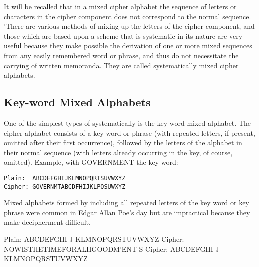 It will be recalled that in a mixed cipher alphabet the sequence of
letters or characters in the cipher component does not correspond to the
normal sequence. 'There are various methods of mixing up the letters of
the cipher component, and those which are based upon a scheme that is
systematic in its nature are very useful because they make possible the
derivation of one or more mixed sequences from any easily remembered
word or phrase, and thus do not necessitate the carrying of written
memoranda. They are called systematically mixed cipher alphabets.

\subsection{Key-word Mixed Alphabets}

\mypara One of the simplest types of systematically 
is the key-word mixed alphabet. The cipher alphabet consists of a key
word or phrase (with repeated letters, if present, omitted after their ﬁrst
occurrence), followed by the letters of the alphabet in their normal
sequence (with letters already occurring in the key, of course, omitted).
Example, with GOVERNMENT the key word:

\begin{verbatim}
Plain:  ABCDEFGHIJKLMNOPQRTSUVWXYZ
Cipher: GOVERNMTABCDFHIJKLPQSUWXYZ
\end{verbatim}

\mypara Mixed alphabets formed by including all repeated letters of the key
word or key phrase were common in Edgar Allan Poe’s day but are
impractical because they make decipherment diﬂicult.

Plain: ABCDEFGHI J KLMNOPQRSTUVWXYZ
Cipher: NOWISTHETIMEFORALIIGOODM'ENT
S Cipher: ABCDEFGHI J KLMNOPQRSTUVWXYZ


